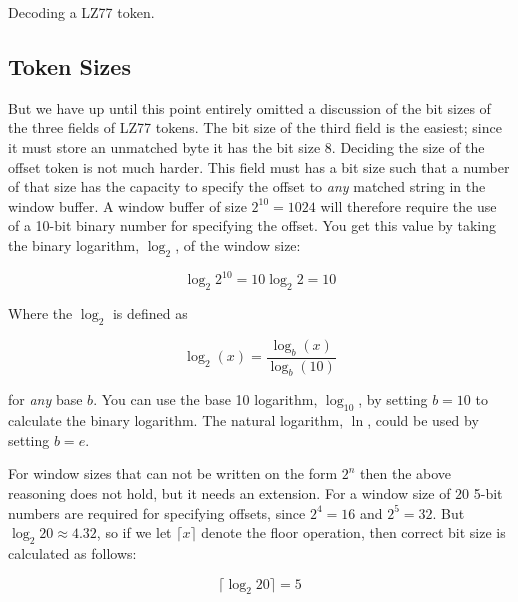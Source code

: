\begin{algorithm}[H]
  \caption{Decoding a LZ77 token.}
  \label{alg:dec-lzone-token}
  \begin{algorithmic}[1]
    \EndRepeatn
  \end{algorithmic}
\end{algorithm}

\subsection{Token Sizes}

But we have up until this point entirely omitted a discussion of the
bit sizes of the three fields of LZ77 tokens. The bit size of the
third field is the easiest; since it must store an unmatched byte it
has the bit size 8. Deciding the size of the offset token is not much
harder. This field must has a bit size such that a number of that size
has the capacity to specify the offset to \textit{any} matched string
in the window buffer. A window buffer of size $2^{10} = 1024$ will
therefore require the use of a 10-bit binary number for specifying the
offset. You get this value by taking the binary logarithm, $\log_2$,
of the window size:

\begin{equation*}
  \log_2 2^{10} = 10\log_2 2 = 10
\end{equation*}

Where the $\log_2$ is defined as

\begin{equation*}
  \log_2(x) = \frac{\log_b (x)}{\log_b (10)}
\end{equation*}

for \textit{any} base $b$. You can use the base 10 logarithm,
$\log_{10}$, by setting $b=10$ to calculate the binary logarithm. The
natural logarithm, $\ln$, could be used by setting $b=e$.

For window sizes that can not be written on the form $2^n$ then the
above reasoning does not hold, but it needs an extension. For a window
size of $20$ 5-bit numbers are required for specifying offsets, since
$2^4 = 16$ and $2^5 = 32$. But $\log_2 20 \approx 4.32$, so if we let
$\lceil x \rceil$ denote the floor operation, then correct bit size is
calculated as follows:

\begin{equation*}
  \lceil\log_2 20\rceil = 5
\end{equation*}

